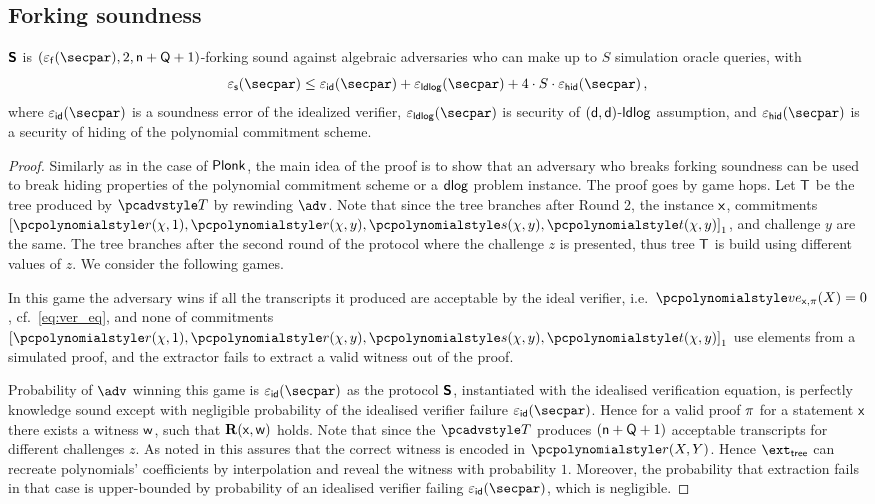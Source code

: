 \documentclass[runningheads,11pt]{llncs}
\begin{document}
\subsection{Forking soundness}
\begin{lemma}
	\label{lem:sonicprot_ss}
  $\bm{\mathsf{S}}$ is $(\epsss(\secpar), 2, \multconstr + \linconstr + 1)$-forking sound against
  algebraic adversaries who can make up to $S$ simulation oracle queries, with
  \[
			\epss(\secpar) \leq \epsid(\secpar) + \epsldlog(\secpar) + 4 \cdot
      S \cdot \epsh(\secpar)\,,
	\]
	where $\epsid(\secpar)$ is a soundness error of the idealized verifier, $\epsldlog(\secpar)$ is
  security of $(\mathsf{d}, \mathsf{d})$-$\mathsf{ldlog}$ assumption, and $\epsh (\secpar)$ is
  a security of hiding of the polynomial commitment scheme.
\end{lemma}
\begin{proof}
  Similarly as in the case of $\textnormal{\textsf{Plonk}}$, the main idea of the proof is to show
  that an adversary who breaks forking soundness can be used to break hiding
  properties of the polynomial commitment scheme or a $\mathsf{dlog}$ problem
  instance. The proof goes by game hops. Let $\mathsf{T}$ be the tree produced by
  $\tdv$ by rewinding $\adv$. Note that since the tree branches after Round 2,
  the instance $\mathsf{x}$, commitments
  $\gone{\p{r} (\chi, 1), \p{r} (\chi, y), \p{s} (\chi, y), \p{t} (\chi, y)}$, and challenge
  $y$ are the same. The tree branches after the second round
  of the protocol where the challenge $z$ is presented, thus tree $\mathsf{T}$ is
  build using different values of $z$.
%
  We consider the following games.

   In this game the adversary wins if all the transcripts it
  produced are acceptable by the ideal verifier,
  i.e.~$\vereq_{\inp, \zkproof}(X) = 0$, cf.~\cref{eq:ver_eq}, and none of
  commitments
  $\gone{\p{r} (\chi, 1), \p{r} (\chi, y), \p{s} (\chi, y), \p{t} (\chi, y)}$ use
    elements from a simulated proof, and the extractor fails to extract a valid
    witness out of the proof.

     Probability of
    $\adv$ winning this game is $\epsid(\secpar)$ as the protocol $\bm{\mathsf{S}}$,
    instantiated with the idealised verification equation, is perfectly
    knowledge sound except with negligible probability of the idealised verifier
    failure $\epsid(\secpar)$. Hence for a valid proof $\pi$ for a
    statement $\mathsf{x}$ there exists a witness $\mathsf{w}$, such that $\mathbf{R}(\mathsf{x}, \mathsf{w})$
    holds. Note that since the $\tdv$ produces $(\mathsf{n} + \mathsf{Q} + 1)$
    acceptable transcripts for different challenges $z$. As noted in
    \cite{CCS:MBKM19} this assures that the correct witness is encoded in
    $\p{r} (X, Y)$. Hence $\extt$ can recreate polynomials' coefficients by
    interpolation and reveal the witness with probability $1$. Moreover, the
    probability that extraction fails in that case is upper-bounded by
    probability of an idealised verifier failing $\epsid(\secpar)$, which is
    negligible.


\end{proof}
\end{document}
